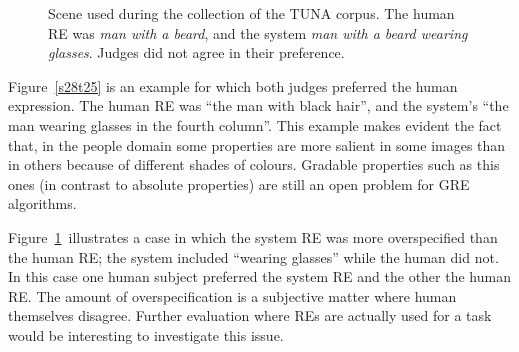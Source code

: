 \begin{figure}[h]
\begin{minipage}{0.48\linewidth}
\vspace*{-.3cm}
\caption{Scene used during the collection of the TUNA corpus. The human RE was \emph{man with a beard}, and the system \emph{man with a beard wearing glasses}. Judges did not agree in their preference.}
\label{s307t21}
\end{minipage}
\end{figure}

Figure~\ref{s28t25} is an example for which both judges preferred the human expression. The human  RE was ``the man with black hair'', and the system's ``the man wearing glasses in the fourth column''. This example makes evident the fact that, in the people domain some properties are more salient in some images than in others because of different shades of colours. Gradable properties such as this ones (in contrast to absolute properties) are still an open problem for GRE algorithms. 

Figure~\ref{s307t21}~illustrates a case in which the system RE was more overspecified than the human RE; the system included ``wearing glasses'' while the human did not. In this case one human subject preferred the system RE and the other the human RE. The amount of overspecification is a subjective matter where human themselves disagree. Further evaluation where REs are actually used for a task would be interesting to investigate this issue.  


